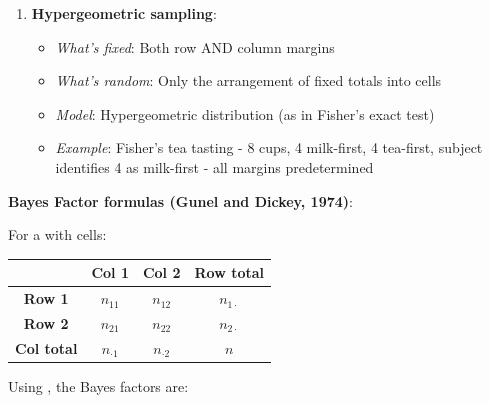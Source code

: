 \begin{enumerate}
    \item \textbf{Hypergeometric sampling}:
        \begin{itemize}
            \item \emph{What's fixed}: Both row AND column margins
            \item \emph{What's random}: Only the arrangement of fixed totals into cells
            \item \emph{Model}: Hypergeometric distribution (as in Fisher's exact test)
            \item \emph{Example}: Fisher's tea tasting - 8 cups, 4 milk-first, 4 tea-first,
                subject identifies 4 as milk-first - all margins predetermined
        \end{itemize}
\end{enumerate}

\textbf{Bayes Factor formulas (Gunel and Dickey, 1974)}:

For a  with cells:
\begin{center}
\begin{tabular}{|c|c|c|c|}
    \hline
    & \textbf{Col 1} & \textbf{Col 2} & \textbf{Row total} \\
    \hline
    \textbf{Row 1} & $n_{11}$ & $n_{12}$ & $n_{1\cdot}$ \\
    \textbf{Row 2} & $n_{21}$ & $n_{22}$ & $n_{2\cdot}$ \\
    \hline
    \textbf{Col total} & $n_{\cdot 1}$ & $n_{\cdot 2}$ & $n$ \\
    \hline
\end{tabular}
\end{center}

Using , the Bayes factors are:

